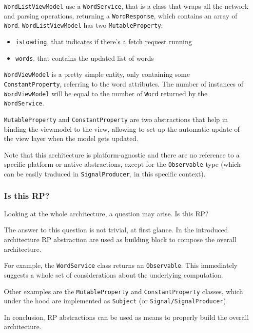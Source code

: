 \texttt{WordListViewModel} use a \texttt{WordService}, that is a class
that wraps all the network and parsing operations, returning a
\texttt{WordResponse}, which contains an array of \texttt{Word}.
\texttt{WordListViewModel} has two \texttt{MutableProperty}:

\begin{itemize}
\itemsep1pt\parskip0pt
\item
  \texttt{isLoading}, that indicates if there's a fetch request running
\item
  \texttt{words}, that contains the updated list of words
\end{itemize}

\texttt{WordViewModel} is a pretty simple entity, only containing some
\texttt{ConstantProperty}, referring to the word attributes. The number
of instances of \texttt{WordViewModel} will be equal to the number of
\texttt{Word} returned by the \texttt{WordService}.

\texttt{MutableProperty} and \texttt{ConstantProperty} are two
abstractions that help in binding the viewmodel to the view, allowing to
set up the automatic update of the view layer when the model gets
updated.

Note that this architecture is platform-agnostic and there are no
reference to a specific platform or native abstractions, except for the
\texttt{Observable} type (which can be easily traduced in
\texttt{SignalProducer}, in this specific context).

\subsubsection{Is this RP?}\label{is-this-rp}

Looking at the whole architecture, a question may arise. Is this RP?

The answer to this question is not trivial, at first glance. In the
introduced architecture RP abstraction are used as building block to
compose the overall architecture.

For example, the \texttt{WordService} class returns an
\texttt{Observable}. This immediately suggests a whole set of
considerations about the underlying computation.

Other examples are the \texttt{MutableProperty} and
\texttt{ConstantProperty} classes, which under the hood are implemented
as \texttt{Subject} (or \texttt{Signal/SignalProducer}).

In conclusion, RP abstractions can be used as means to properly build
the overall architecture.


